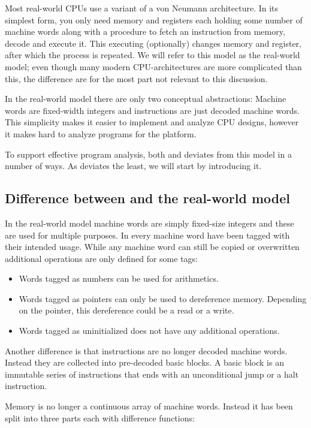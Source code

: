 Most real-world CPUs use a variant of a von Neumann architecture. In its
simplest form, you only need memory and registers each holding some number of
machine words along with a procedure to fetch an instruction from memory, decode
and execute it. This executing (optionally) changes memory and register, after
which the process is repeated. We will refer to this model as the real-world
model; even though many modern CPU-architectures are more complicated than this,
the difference are for the most part not relevant to this discussion.

In the real-world model there are only two conceptual abstractions: Machine
words are fixed-width integers and instructions are just decoded machine
words. This simplicity makes it easier to implement and analyze CPU designs,
however it makes hard to analyze programs for the platform.

To support effective program analysis, both \ATAL and \ATALe deviates from this
model in a number of ways. As \ATALe deviates the least, we will start by
introducing it.

\subsection{Difference between \ATALe and the real-world model}

In the real-world model machine words are simply fixed-size integers and these
are used for multiple purposes. In \ATALe every machine word have been tagged
with their intended usage. While any machine word can still be copied or
overwritten additional operations are only defined for some tags:

\begin{itemize}
\item Words tagged as numbers can be used for arithmetics.
\item Words tagged as pointers can only be used to dereference memory. Depending
  on the pointer, this dereference could be a read or a write.
\item Words tagged as uninitialized does not have any additional operations.
\end{itemize}

Another difference is that instructions are no longer decoded machine
words. Instead they are collected into pre-decoded basic blocks. A basic block
is an immutable series of instructions that ends with an unconditional jump or a
halt instruction.

Memory is no longer a continuous array of machine words. Instead it has been
split into three parts each with difference functions:

